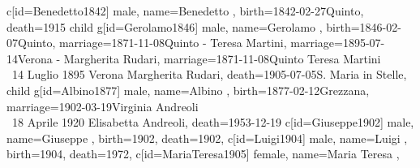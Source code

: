 \documentclass{article}
\begin{document}
\begin{midpage}
\begin{center}
\begin{genealogypicture}
{{{{{{{                        }
                        c[id=Benedetto1842]{
                            male,
                            name={Benedetto },
                            birth={1842-02-27}{Quinto},
                            death={1915}{}
                        }
                        child{
                            g[id=Gerolamo1846]{
                                male,
                                name={Gerolamo },
                                birth={1846-02-07}{Quinto},
                                marriage={1871-11-08}{Quinto - Teresa Martini},
                                marriage={1895-07-14}{Verona - Margherita Rudari},
                                marriage={1871-11-08}{Quinto \newline Teresa Martini \\ \gtrsymMarried~14 Luglio 1895 \newline \hspace*{3mm} Verona \newline \hspace*{3mm} Margherita Rudari},
                                death={1905-07-05}{S. Maria in Stelle},
                            }
                            child{
                                g[id=Albino1877]{
                                    male,
                                    name={Albino },
                                    birth={1877-02-12}{Grezzana},
                                    marriage={1902-03-19}{Virginia Andreoli \\ \gtrsymMarried~18 Aprile 1920 \newline \hspace*{3mm} Elisabetta Andreoli},
                                    death={1953-12-19}{}
                                }
                                c[id=Giuseppe1902]{
                                    male,
                                    name={Giuseppe },
                                    birth={1902}{},
                                    death={1902}{},
                                }
                                c[id=Luigi1904]{
                                    male,
                                    name={Luigi },
                                    birth={1904}{},
                                    death={1972}{},
                                }
                                c[id=MariaTeresa1905]{
                                    female,
                                    name={Maria Teresa },
}}}}}}}}}
\end{genealogypicture}
\end{center}
\end{midpage}
\end{document}
